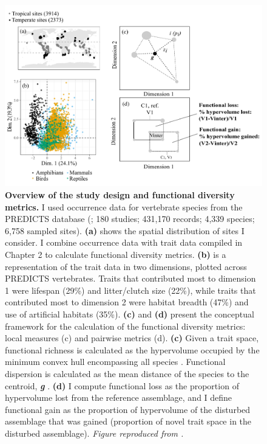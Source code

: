 \begin{figure}[h!]
\centering
\includegraphics[scale=0.55]{figures/Chapter_FD/Figure1}
\caption[Overview of the study design and functional diversity metrics]{\textbf{Overview of the study design and functional diversity metrics.} I used occurrence data for vertebrate species from the PREDICTS database (\citep{Hudson2014, Hudson2017}; 180 studies; 431,170 records; 4,339 species; 6,758 sampled sites). \textbf{(a)} shows the spatial distribution of sites I consider. I combine occurrence data with trait data compiled in Chapter 2 to calculate functional diversity metrics. \textbf{(b)} is a representation of the trait data in two dimensions, plotted across PREDICTS vertebrates. Traits that contributed most to dimension 1 were lifespan (29\%) and litter/clutch size (22\%), while traits that contributed most to dimension 2 were habitat breadth (47\%) and use of artificial habitats (35\%). \textbf{(c)} and \textbf{(d)} present the conceptual framework for the calculation of the functional diversity metrics: local measures (c) and pairwise metrics (d). \textbf{(c)} Given a trait space, functional richness is calculated as the hypervolume occupied by the minimum convex hull encompassing all species \citep{Villeger2008}. Functional dispersion is calculated as the mean distance of the species to the centroid, \textbf{\textit{g}} \citep{Laliberte2010}. \textbf{(d)} I compute functional loss as the proportion of hypervolume lost from the reference assemblage, and I define functional gain as the proportion of hypervolume of the disturbed assemblage that was gained (proportion of novel trait space in the disturbed assemblage). \textit{Figure reproduced from \citet{Etard2022}.}}
\label{chap3_fig1}
\end{figure}



